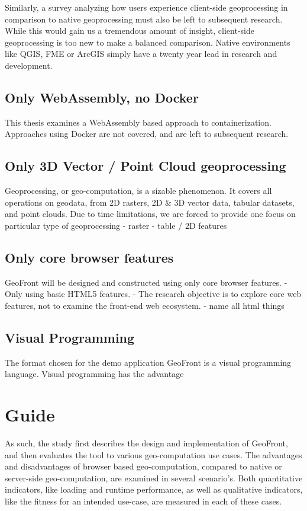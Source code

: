 
Similarly, a survey analyzing how users experience client-side geoprocessing in comparison to native geoprocessing must also be left to subsequent research. While this would gain us a tremendous amount of insight, client-side geoprocessing is too new to make a balanced comparison. Native environments like QGIS, FME or ArcGIS simply have a twenty year lead in research and development. 



\subsection {Only WebAssembly, no Docker}
This thesis examines a WebAssembly based approach to containerization. Approaches using Docker are not covered, and are left to subsequent research.

\subsection*{ Only 3D Vector / Point Cloud geoprocessing}
Geoprocessing, or geo-computation, is a sizable phenomenon. 
It covers all operations on geodata, from 2D rasters, 2D \& 3D vector data, tabular datasets, and point clouds. 
Due to time limitations, we are forced to provide one focus on particular type of geoprocessing
- raster
- table / 2D features

\subsection*{ Only core browser features }
GeoFront will be designed and constructed using only core browser features. 
- Only using basic HTML5 features.
- The research objective is to explore core web features, not to examine the front-end web ecosystem. 
- name all html things

\subsection*{ Visual Programming }
The format chosen for the demo application GeoFront is a visual programming language. Visual programming has the advantage 

\section{Guide}

As such, the study first describes the design and implementation of GeoFront, and then evaluates the tool to various geo-computation use cases.
The advantages and disadvantages of browser based geo-computation, compared to native or server-side geo-computation, are examined in several scenario's. 
Both quantitative indicators, like loading and runtime performance, as well as qualitative indicators, like the fitness for an intended use-case, are measured in each of these cases.